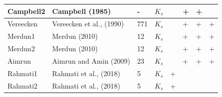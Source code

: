 \begin{landscape}
\begin{ThreePartTable}
\begin{center}
\begin{longtable}{p{2cm}<{\centering}p{4cm}<{\centering}p{2cm}<{\centering}p{2.8cm}<{\centering}p{2cm}<{\centering}p{2cm}<{\centering}p{2cm}<{\centering}p{2cm}<{\centering}}
Campbell2&	Campbell (1985)&	-&	$K_s$&	&	+&	+&	\\\midrule
Vereecken&	Vereecken et al., (1990)&	771&	$K_s$&	&	+&	+&	+\\\midrule
Merdun1&	Merdun (2010)&	12&	$K_s$&	&	+&	+&	+\\\midrule
Merdun2&	Merdun (2010)&	12&	$K_s$&	&	+&	+&	+\\\midrule
Aimrun&	Aimrun and Amin (2009)&	23&	$K_s$&	&	+&	+&	+\\\midrule
Rahmati1&	Rahmati et al., (2018)&	5&	$K_s$&	+&	&	&	\\\midrule
Rahmati2&	Rahmati et al., (2018)&	5&	$K_s$&	+&	&	&	\\
\hline
\end{longtable}
\end{center}
\end{ThreePartTable}
\end{landscape}






